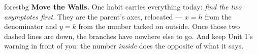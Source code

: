 \documentclass[10pt]{article}
\begin{document}
\namepartnerperiod

\vspace{0.08in}

\begin{headlinebox}{forestbg}
\small\textbf{Move the Walls.} One habit carries everything today: \emph{find the two asymptotes
first.} They are the parent's axes, relocated --- $x=h$ from the denominator and $y=k$ from the number
tacked on outside. Once those two dashed lines are down, the branches have nowhere else to go. And keep
Unit 1's warning in front of you: the number \emph{inside} does the opposite of what it says.
\end{headlinebox}

\vspace{0.06in}
\end{document}
